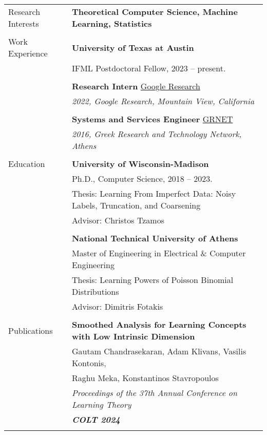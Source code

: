 \documentclass[letterpaper,11pt,oneside]{article}
\begin{document}
\noindent \begin{longtable}{@{} l l}
\Large{Research Interests} & \textbf{Theoretical Computer Science, Machine Learning, Statistics}
\\
&\\

\Large{Work Experience}

  & \textbf{University of Texas at Austin} \\
  & IFML Postdoctoral Fellow, 2023 -- present. \\
  & \\

  &\textbf{Research Intern} \href{https://research.google}{Google Research}\\
  & \emph{2022, Google Research, Mountain View, California}\\
  &\\
  
  &\textbf{Systems and Services Engineer} \href{https://grnet.gr/}{GRNET}\\
  & \emph{2016, Greek Research and Technology Network, Athens}\\
  &\\

 \Large{Education}


     & \textbf{University of Wisconsin-Madison} \\
     & Ph.D., Computer Science, 2018 -- 2023. \\
     & Thesis: Learning From Imperfect Data: Noisy Labels, Truncation, and Coarsening \\
     & Advisor: Christos Tzamos\\
     & \\

     & \textbf{National Technical University of Athens} \\
     & Master of Engineering in Electrical \& Computer Engineering\\
     & Thesis: Learning Powers of Poisson Binomial Distributions\\
     & Advisor: Dimitris Fotakis \\
     & \\

 \Large{Publications}

 &\textbf{Smoothed Analysis for Learning Concepts with Low Intrinsic Dimension} \\
 & Gautam Chandrasekaran, Adam Klivans, Vasilis Kontonis, \\
 & Raghu Meka, Konstantinos Stavropoulos \\
 & \emph{Proceedings of the 37th Annual Conference on Learning Theory} \\
 & \emph{\textbf{COLT 2024}} \\
 & \\


\end{longtable}
\end{document}
